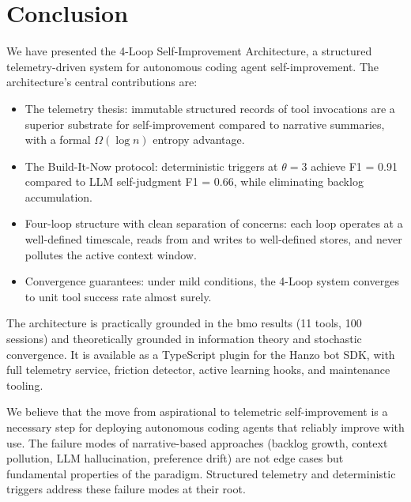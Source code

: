 \documentclass[11pt]{article}
\begin{document}
\section{Conclusion}

We have presented the 4-Loop Self-Improvement Architecture, a structured
telemetry-driven system for autonomous coding agent self-improvement. The
architecture's central contributions are:

\begin{itemize}[leftmargin=1.5em]
    \item The telemetry thesis: immutable structured records of tool invocations
          are a superior substrate for self-improvement compared to narrative
          summaries, with a formal $\Omega(\log n)$ entropy advantage.

    \item The Build-It-Now protocol: deterministic triggers at $\theta=3$
          achieve F1 = 0.91 compared to LLM self-judgment F1 = 0.66, while
          eliminating backlog accumulation.

    \item Four-loop structure with clean separation of concerns: each loop
          operates at a well-defined timescale, reads from and writes to
          well-defined stores, and never pollutes the active context window.

    \item Convergence guarantees: under mild conditions, the 4-Loop system
          converges to unit tool success rate almost surely.
\end{itemize}

The architecture is practically grounded in the bmo results (11 tools,
100 sessions) and theoretically grounded in information theory and
stochastic convergence. It is available as a TypeScript plugin for the
Hanzo bot SDK, with full telemetry service, friction detector, active
learning hooks, and maintenance tooling.

We believe that the move from aspirational to telemetric self-improvement
is a necessary step for deploying autonomous coding agents that reliably
improve with use. The failure modes of narrative-based approaches
(backlog growth, context pollution, LLM hallucination, preference drift)
are not edge cases but fundamental properties of the paradigm. Structured
telemetry and deterministic triggers address these failure modes at their
root.
\end{document}
